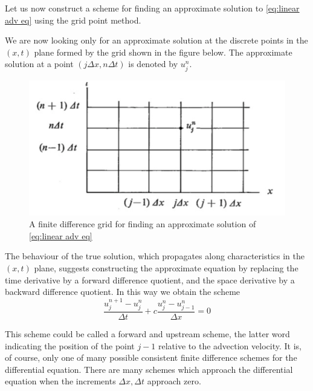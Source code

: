Let us now construct a scheme for finding an approxi­mate solution to \ref{eq:linear adv eq} using the grid point method.

We are now looking only for an approximate solution at the discrete points in the $(x,t)$ plane formed by the grid shown in the figure below. The approximate solution at a point $(j\Delta x,n\Delta t)$ is denoted by $u^n_j$.
\begin{figure}[htpb]
	\centering
	\includegraphics[width=0.35\linewidth]{uploads/Screenshot 2024-12-07 163047.png}
	\caption{A finite difference grid for finding an approximate solution of \ref{eq:linear adv eq}}
	\label{fig:grid sol lin adv eq}
\end{figure}

The behaviour of the true solution, which propagates along characteristics in the $(x,t)$ plane, suggests constructing the approximate equation by replacing the time derivative by a forward difference quotient, and the space derivative by a backward difference quotient. In this way we obtain the scheme
\begin{equation}\label{eq:forward and upward scheme}
	\frac{u_j^{n+1}-u_j^n}{\Delta t}+c\frac{u_j^n-u^n_{j-1}}{\Delta x}=0
\end{equation}

This scheme could be called a forward and upstream scheme, the latter word indicating the position of the point $j-1$ relative to the advection velocity. It is, of course, only one of many possible consistent finite difference schemes for the differential equation. There are many schemes which approach the differential equation when the increments $\Delta x,\Delta t$ approach zero.

